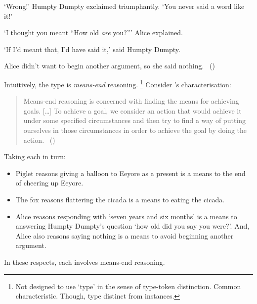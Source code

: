\begin{note}
\begin{scenario}
    \noindent%
    `Wrong!'
    Humpty Dumpty exclaimed triumphantly.
    `You never said a word like it!'

    \noindent%
    `I thought you meant ``How old \emph{are} you?'''
    Alice explained.

    \noindent%
    `If I'd meant that, I'd have said it,'
    said Humpty Dumpty.

    \noindent%
    Alice didn't want to begin another argument, so she said nothing.\newline
    \mbox{ }\hfill\mbox{(\cite[188]{Carroll:2009aa})}\newline
    \mbox{ }
  \end{scenario}
\end{note}

\begin{note}
  Intuitively, the type is \emph{means-end} reasoning.%
  \footnote{
    Not designed to use `type' in the sense of type-token distinction.
    Common characteristic.
    Though, type distinct from instances.
  }
  Consider \citeauthor{Pollock:2002aa}'s characterisation:

  \begin{quote}
    Means-end reasoning is concerned with finding the means for achieving goals.
    [\dots]
    To achieve a goal, we consider an action that would achieve it under some specified circumstances and then try to find a way of putting ourselves in those circumstances in order to achieve the goal by doing the action.%
    \mbox{ }\hfill\mbox{(\citeyear[60]{Pollock:2002aa})}
  \end{quote}

  \noindent%
  Taking each  in turn:
  \begin{itemize}
  \item
    Piglet reasons giving a balloon to Eeyore as a present is a means to the end of cheering up Eeyore.
  \item
    The fox reasons flattering the cicada is a means to eating the cicada.
  \item
    Alice reasons responding with `seven years and six months' is a means to answering Humpty Dumpty's question `how old did you say you were?'.
    And, Alice also reasons saying nothing is a means to avoid beginning another argument.
  \end{itemize}

  \noindent%
  In these respects, each  involves means-end reasoning.
\end{note}


